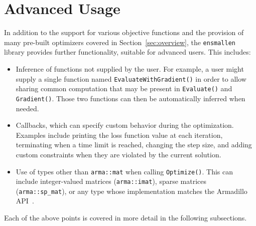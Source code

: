 \section{Advanced Usage}
\label{sec:advanced}

In addition to the support for various objective functions and
the provision of many pre-built optimizers covered in Section~\ref{sec:overview},
the {\tt ensmallen} library provides further functionality, suitable for advanced users.
This includes:

\begin{itemize}

\item
Inference of functions not supplied by the user.
For example, a user might supply a single function named
{\tt EvaluateWithGradient()}
in order to allow sharing common computation that may be 
present in {\tt Evaluate()} and {\tt Gradient()}.
Those two functions can then be automatically inferred when needed.

\item
Callbacks, which can specify custom behavior during the optimization.
Examples include printing the loss function value at each iteration,
terminating when a time limit is reached,
changing the step size,
and adding custom constraints when they are violated by the current solution.

\item
Use of types other than {\tt arma::mat} when calling {\tt Optimize()}.
This can include
integer-valued matrices ({\tt arma::imat}),
sparse matrices ({\tt arma::sp\_mat}),
or any type whose implementation matches the Armadillo API~\cite{sanderson2016armadillo,sanderson2018user}.

\end{itemize}

Each of the above points is covered in more detail in the following subsections.
